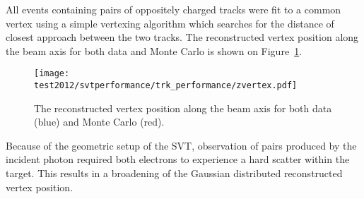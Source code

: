 
All events containing pairs of oppositely charged tracks were fit to a
common vertex using a simple vertexing algorithm which searches for the distance
of closest approach between the two tracks.  The reconstructed vertex position
along the beam axis for both data and Monte Carlo is shown on 
Figure~\ref{fig:vz_position}.
\begin{figure}[h]
    \begin{center}
    	\texttt{[image: test2012/svtperformance/trk\_performance/zvertex.pdf]}
        \caption{  
                    The reconstructed vertex position along the beam axis for
                    both data (blue) and Monte Carlo (red).
                } 
	\label{fig:vz_position}
    \end{center}
\end{figure}
Because of the geometric setup of the SVT, observation of pairs produced by
the incident photon required both electrons to experience a hard scatter
within the target.  This results in a broadening of the Gaussian 
distributed reconstructed vertex position. 

